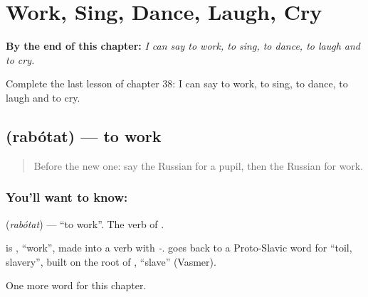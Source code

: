 
\chapter{Work, Sing, Dance, Laugh, Cry}
\label{ch:ru-work-sing-dance-laugh-cry}

\begin{chapteropening}
\textbf{By the end of this chapter:} \emph{I can say to work, to sing, to dance, to laugh and to cry.}

Complete the last lesson of chapter 38: I can say to work, to sing, to dance, to laugh and to cry.
\end{chapteropening}

\section[\texorpdfstring{\ru{работать} (rabótat)}{работать (rabótat)}]{ (rabótat) — to work}

\label{lesson:RU-C38-rabotat}



\begin{quote}
Before the new one: say the Russian for a pupil, then the Russian for work.
\end{quote}

\subsection*{You'll want to know: }
\textbf{} (\emph{rabótat}) — \textquotedblleft{}to work\textquotedblright{}. The verb of \textbf{}.

\begin{cousinweb}
\textbf{} is \emph{}, \textquotedblleft{}work\textquotedblright{}, made into a verb with \emph{-}. \emph{} goes back to a Proto-Slavic word for \textquotedblleft{}toil, slavery\textquotedblright{}, built on the root of \emph{}, \textquotedblleft{}slave\textquotedblright{} (Vasmer).
\end{cousinweb}

\begin{grammarlens}[title={What you've built}]
One more word for this chapter.
\end{grammarlens}

